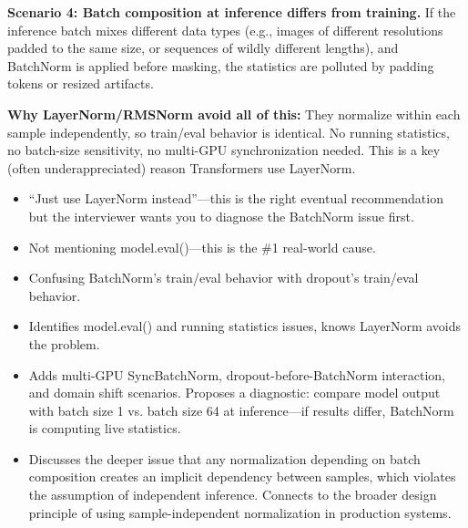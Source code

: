 \begin{interviewq}
\textbf{Scenario 4: Batch composition at inference differs from training.} If the inference batch mixes different data types (e.g., images of different resolutions padded to the same size, or sequences of wildly different lengths), and BatchNorm is applied before masking, the statistics are polluted by padding tokens or resized artifacts.

\textbf{Why LayerNorm/RMSNorm avoid all of this:} They normalize within each sample independently, so train/eval behavior is identical. No running statistics, no batch-size sensitivity, no multi-GPU synchronization needed. This is a key (often underappreciated) reason Transformers use LayerNorm.

\redflags
\begin{itemize}
    \item ``Just use LayerNorm instead''---this is the right eventual recommendation but the interviewer wants you to diagnose the BatchNorm issue first.
    \item Not mentioning model.eval()---this is the \#1 real-world cause.
    \item Confusing BatchNorm's train/eval behavior with dropout's train/eval behavior.
\end{itemize}


\goodgreat
\begin{itemize}
    \item {} Identifies model.eval() and running statistics issues, knows LayerNorm avoids the problem.
    \item {} Adds multi-GPU SyncBatchNorm, dropout-before-BatchNorm interaction, and domain shift scenarios. Proposes a diagnostic: compare model output with batch size 1 vs. batch size 64 at inference---if results differ, BatchNorm is computing live statistics.
    \item {} Discusses the deeper issue that any normalization depending on batch composition creates an implicit dependency between samples, which violates the assumption of independent inference. Connects to the broader design principle of using sample-independent normalization in production systems.
\end{itemize}

\end{interviewq}

